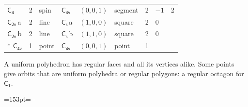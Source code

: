 \documentclass[10pt,a4paper]{article}
\newcommand{\needspace}[1]{\par\penalty-100\begingroup\dimen0=#1\relax\dimen2=\pagegoal
  \advance\dimen2-\pagetotal\ifdim\dimen0>\dimen2\relax\ifdim\dimen2>0pt\vfil\break\fi\fi
  \endgroup}
\numberwithin{equation}{section}
\newcommand{\grp}[1]{\mathsf{#1}}
\newcommand{\clsletter}[1]{\,{\scriptsize\color{black!55}#1}}
\newlength{\fillwidth}\newlength{\cellwidth}\newlength{\colwidth}
\begin{document}
{{\begin{longtable}{@{}lrllllr>{\RaggedRight\arraybackslash}p{\fillwidth}r@{}}
\href{C4.pdf}{$\grp{C_{4}}$} & 2 & spin & \href{C4v.pdf}{$\grp{C_{4v}}$} & $(0, 0, 1)$ & segment & 2 & ${-1}$ & 2\\
\href{C2v.pdf}{$\grp{C_{2v}}$}\clsletter{a} & 2 & line & \href{C1v.pdf}{$\grp{C_{s}}$}\clsletter{a} & $(1, 0, 0)$ & square & 2 & ${0}$ & \\
\href{C2v.pdf}{$\grp{C_{2v}}$}\clsletter{b} & 2 & line & \href{C1v.pdf}{$\grp{C_{s}}$}\clsletter{b} & $(1, 1, 0)$ & square & 2 & ${0}$ & \\*
\href{C4v.pdf}{$\grp{C_{4v}}$} & 1 & point & \href{C4v.pdf}{$\grp{C_{4v}}$} & $(0, 0, 1)$ & point & 1 &  & \\
\bottomrule\end{longtable}}}
A uniform polyhedron has regular faces and all its vertices alike. Some points give orbits that are uniform polyhedra or regular polygons: a regular octagon for \href{C1.pdf}{$\grp{C_{1}}$}.
\needspace{153pt}
\end{document}
